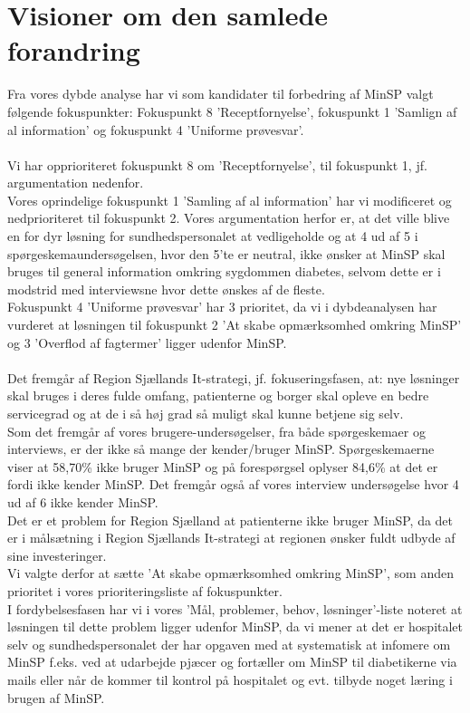 \section{Visioner om den samlede forandring}
Fra vores dybde analyse har vi som kandidater til forbedring af MinSP valgt følgende fokuspunkter: Fokuspunkt 8 'Receptfornyelse', fokuspunkt 1 'Samlign af al information' og fokuspunkt 4 'Uniforme prøvesvar'.
\\\\
Vi har opprioriteret fokuspunkt 8 om 'Receptfornyelse', til fokuspunkt 1, jf. argumentation nedenfor.\\
Vores oprindelige fokuspunkt 1 'Samling af al information' har vi modificeret og nedprioriteret til fokuspunkt 2. Vores argumentation herfor er, at det ville blive en for dyr løsning for sundhedspersonalet  at vedligeholde og at 4 ud af 5 i spørgeskemaundersøgelsen, hvor den 5'te er neutral, ikke ønsker at MinSP skal bruges til general information omkring sygdommen diabetes, selvom dette er i modstrid med interviewsne hvor dette ønskes af de fleste.\\
Fokuspunkt 4 'Uniforme prøvesvar' har 3 prioritet, da vi i dybdeanalysen har vurderet at løsningen til fokuspunkt 2 'At skabe opmærksomhed omkring MinSP' og 3 'Overflod af fagtermer' ligger udenfor MinSP.
\\\\
Det fremgår af Region Sjællands It-strategi, jf. fokuseringsfasen, at: nye løsninger skal bruges i deres fulde omfang, patienterne og borger skal opleve en bedre servicegrad og at de i så høj grad så muligt skal kunne betjene sig selv.\\
Som det fremgår af vores brugere-undersøgelser, fra både spørgeskemaer og interviews, er der ikke så mange der kender/bruger MinSP. Spørgeskemaerne viser at 58,70\% ikke bruger MinSP og på forespørgsel oplyser 84,6\% at det er fordi ikke kender MinSP. Det fremgår også af vores interview undersøgelse hvor 4 ud af 6 ikke kender MinSP.\\
Det er et problem for Region Sjælland at patienterne ikke bruger MinSP, da det er i målsætning i Region Sjællands It-strategi at regionen ønsker fuldt udbyde af sine investeringer. \\
Vi valgte derfor at sætte 'At skabe opmærksomhed omkring MinSP', som anden prioritet i vores prioriteringsliste af fokuspunkter. \\
I fordybelsesfasen har vi i vores 'Mål, problemer, behov, løsninger'-liste noteret at løsningen til dette problem ligger udenfor MinSP, da vi mener at det er hospitalet selv og sundhedspersonalet der har opgaven med at systematisk at infomere om MinSP f.eks. ved at udarbejde pjæcer og fortæller om MinSP til diabetikerne via mails eller når de kommer til kontrol på hospitalet og evt. tilbyde noget læring i brugen af MinSP.\\
